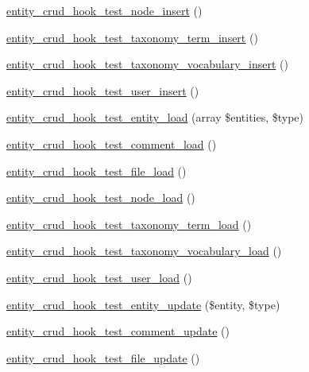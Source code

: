 \begin{DoxyCompactItemize}
\item 
\hyperlink{entity__crud__hook__test_8module_a42d8eb4c39eb5e57a9fcc04bf677dd43}{entity\_\-crud\_\-hook\_\-test\_\-node\_\-insert} ()
\item 
\hyperlink{entity__crud__hook__test_8module_a9eecb70ecfc87d16a6466a2122e12794}{entity\_\-crud\_\-hook\_\-test\_\-taxonomy\_\-term\_\-insert} ()
\item 
\hyperlink{entity__crud__hook__test_8module_a778820d64c6c73c9d950b5ec1da6051d}{entity\_\-crud\_\-hook\_\-test\_\-taxonomy\_\-vocabulary\_\-insert} ()
\item 
\hyperlink{entity__crud__hook__test_8module_afd081dade5eef730c594e026194c3997}{entity\_\-crud\_\-hook\_\-test\_\-user\_\-insert} ()
\item 
\hyperlink{entity__crud__hook__test_8module_afc2f5463fb4fff838c2dac32bfd6e819}{entity\_\-crud\_\-hook\_\-test\_\-entity\_\-load} (array \$entities, \$type)
\item 
\hyperlink{entity__crud__hook__test_8module_ae66720d6c5e9b63c11e8aa9581c71976}{entity\_\-crud\_\-hook\_\-test\_\-comment\_\-load} ()
\item 
\hyperlink{entity__crud__hook__test_8module_a8a2cc4ae557a030d6997fd5b15fd519a}{entity\_\-crud\_\-hook\_\-test\_\-file\_\-load} ()
\item 
\hyperlink{entity__crud__hook__test_8module_ac63d0ca07f9713c01eab1330ed9312cb}{entity\_\-crud\_\-hook\_\-test\_\-node\_\-load} ()
\item 
\hyperlink{entity__crud__hook__test_8module_ada451e6ec6cb03e67d903ee49b15604b}{entity\_\-crud\_\-hook\_\-test\_\-taxonomy\_\-term\_\-load} ()
\item 
\hyperlink{entity__crud__hook__test_8module_a087e1d1d77228b63d6b3083f36cc02f2}{entity\_\-crud\_\-hook\_\-test\_\-taxonomy\_\-vocabulary\_\-load} ()
\item 
\hyperlink{entity__crud__hook__test_8module_aa086d7d537909ca4688df00c35d5d608}{entity\_\-crud\_\-hook\_\-test\_\-user\_\-load} ()
\item 
\hyperlink{entity__crud__hook__test_8module_a7b8c9d897b1eca38bc0cb7c985f13781}{entity\_\-crud\_\-hook\_\-test\_\-entity\_\-update} (\$entity, \$type)
\item 
\hyperlink{entity__crud__hook__test_8module_ab2337db05739590270dbf2510f5054b3}{entity\_\-crud\_\-hook\_\-test\_\-comment\_\-update} ()
\item 
\hyperlink{entity__crud__hook__test_8module_a1bba8058f52bc6276f3e91f86bf161f0}{entity\_\-crud\_\-hook\_\-test\_\-file\_\-update} ()

\end{DoxyCompactItemize}
